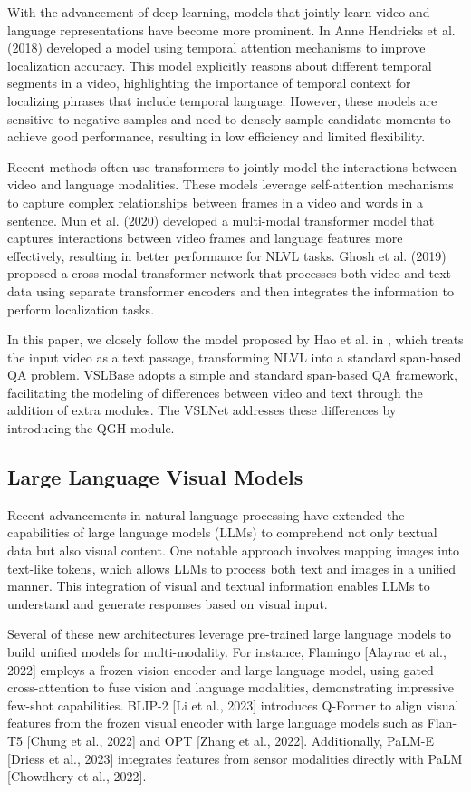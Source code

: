 \documentclass[conference]{IEEEtran}
\begin{document}
With the advancement of deep learning, models that jointly learn video and language representations have become more prominent. In \cite{b5} Anne Hendricks et al. (2018) developed a model using temporal attention mechanisms to improve localization accuracy. This model explicitly reasons about different temporal segments in a video, highlighting the importance of temporal context for localizing phrases that include temporal language. However, these models are sensitive to negative samples and need to densely sample candidate moments to achieve good performance, resulting in low efficiency and limited flexibility.

Recent methods often use transformers to jointly model the interactions between video and language modalities. These models leverage self-attention mechanisms to capture complex relationships between frames in a video and words in a sentence. Mun et al. (2020) developed a multi-modal transformer model that captures interactions between video frames and language features more effectively, resulting in better performance for NLVL tasks. Ghosh et al. (2019) proposed a cross-modal transformer network that processes both video and text data using separate transformer encoders and then integrates the information to perform localization tasks.

In this paper, we closely follow the model proposed by Hao et al. in \cite{b3}, which treats the input video as a text passage, transforming NLVL into a standard span-based QA problem. VSLBase adopts a simple and standard span-based QA framework, facilitating the modeling of differences between video and text through the addition of extra modules. The VSLNet addresses these differences by introducing the QGH module.



\subsection{Large Language Visual Models}
Recent advancements in natural language processing have extended the capabilities of large language models (LLMs) to comprehend not only textual data but also visual content. One notable approach involves mapping images into text-like tokens, which allows LLMs to process both text and images in a unified manner. This integration of visual and textual information enables LLMs to understand and generate responses based on visual input.

Several of these new architectures leverage pre-trained large language models to build unified models for multi-modality. For instance, Flamingo [Alayrac et al., 2022] employs a frozen vision encoder and large language model, using gated cross-attention to fuse vision and language modalities, demonstrating impressive few-shot capabilities. BLIP-2 [Li et al., 2023] introduces Q-Former to align visual features from the frozen visual encoder with large language models such as Flan-T5 [Chung et al., 2022] and OPT [Zhang et al., 2022]. Additionally, PaLM-E [Driess et al., 2023] integrates features from sensor modalities directly with PaLM [Chowdhery et al., 2022].
\end{document}
